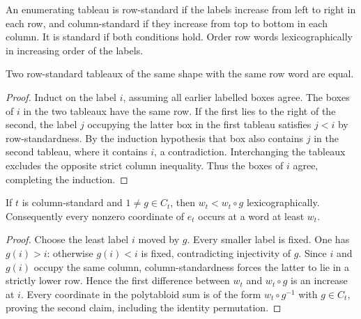 \begin{definition}
\label{def:standard-tableau}
\leanok
An enumerating tableau is row-standard if the labels increase from
left to right in each row, and column-standard if they increase from
top to bottom in each column. It is standard if both conditions hold.
Order row words lexicographically in increasing order of the labels.
\end{definition}

\begin{lemma}
\label{lem:row-standard-injective}
\leanok
Two row-standard tableaux of the same shape with the same row word
are equal.
\end{lemma}
\begin{proof}
Induct on the label $i$, assuming all earlier labelled boxes agree.
The boxes of $i$ in the two tableaux have the same row. If the first
lies to the right of the second, the label $j$ occupying the latter
box in the first tableau satisfies $j<i$ by row-standardness.
By the induction hypothesis that box also contains $j$ in the second
tableau, where it contains $i$, a contradiction. Interchanging the
tableaux excludes the opposite strict column inequality. Thus the
boxes of $i$ agree, completing the induction.
\end{proof}

\begin{lemma}
\label{lem:column-standard-leading-word}
\leanok
If $t$ is column-standard and $1\ne g\in C_t$, then
$w_t<w_t\circ g$ lexicographically. Consequently every nonzero
coordinate of $e_t$ occurs at a word at least $w_t$.
\end{lemma}
\begin{proof}
Choose the least label $i$ moved by $g$. Every smaller label is fixed.
One has $g(i)>i$: otherwise $g(i)<i$ is fixed, contradicting
injectivity of $g$. Since $i$ and $g(i)$ occupy the same column,
column-standardness forces the latter to lie in a strictly lower
row. Hence the first difference between $w_t$ and $w_t\circ g$
is an increase at $i$. Every coordinate in the polytabloid sum is
of the form $w_t\circ g^{-1}$ with $g\in C_t$, proving the second
claim, including the identity permutation.
\end{proof}

